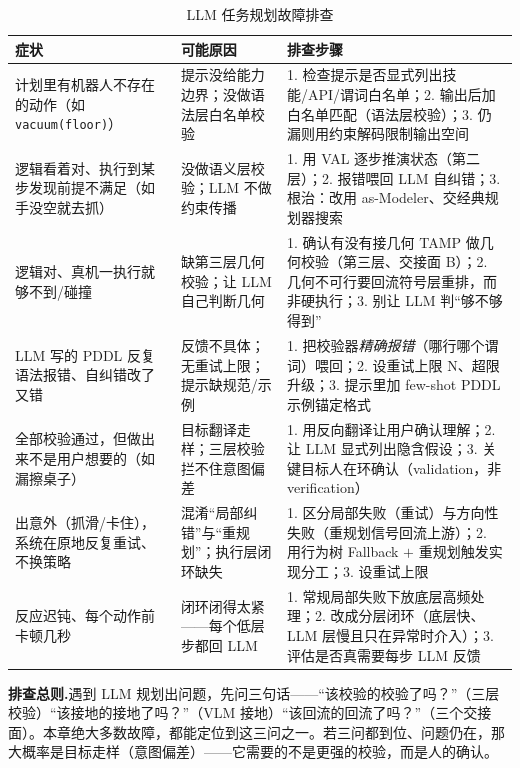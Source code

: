 \begin{table}[H]\centering\small
\caption{LLM 任务规划故障排查}
\label{tab:llm-troubleshoot}
\begin{tabular}{p{3.4cm}p{3.4cm}p{5.2cm}}
\toprule
症状 & 可能原因 & 排查步骤 \\
\midrule
计划里有机器人不存在的动作（如 \texttt{vacuum(floor)}） & 提示没给能力边界；没做语法层白名单校验 & 1. 检查提示是否显式列出技能/API/谓词白名单；2. 输出后加白名单匹配（语法层校验）；3. 仍漏则用约束解码限制输出空间 \\
逻辑看着对、执行到某步发现前提不满足（如手没空就去抓） & 没做语义层校验；LLM 不做约束传播 & 1. 用 VAL 逐步推演状态（第二层）；2. 报错喂回 LLM 自纠错；3. 根治：改用 as-Modeler、交经典规划器搜索 \\
逻辑对、真机一执行就够不到/碰撞 & 缺第三层几何校验；让 LLM 自己判断几何 & 1. 确认有没有接几何 TAMP 做几何校验（第三层、交接面 B）；2. 几何不可行要回流符号层重排，而非硬执行；3. 别让 LLM 判“够不够得到” \\
LLM 写的 PDDL 反复语法报错、自纠错改了又错 & 反馈不具体；无重试上限；提示缺规范/示例 & 1. 把校验器\emph{精确报错}（哪行哪个谓词）喂回；2. 设重试上限 N、超限升级；3. 提示里加 few-shot PDDL 示例锚定格式 \\
全部校验通过，但做出来不是用户想要的（如漏擦桌子） & 目标翻译走样；三层校验拦不住意图偏差 & 1. 用反向翻译让用户确认理解；2. 让 LLM 显式列出隐含假设；3. 关键目标人在环确认（validation，非 verification） \\
出意外（抓滑/卡住），系统在原地反复重试、不换策略 & 混淆“局部纠错”与“重规划”；执行层闭环缺失 & 1. 区分局部失败（重试）与方向性失败（重规划信号回流上游）；2. 用行为树 Fallback $+$ 重规划触发实现分工；3. 设重试上限 \\
反应迟钝、每个动作前卡顿几秒 & 闭环闭得太紧——每个低层步都回 LLM & 1. 常规局部失败下放底层高频处理；2. 改成分层闭环（底层快、LLM 层慢且只在异常时介入）；3. 评估是否真需要每步 LLM 反馈 \\
\bottomrule
\end{tabular}
\end{table}

\begin{note}
\textbf{排查总则.}\;遇到 LLM 规划出问题，先问三句话——“该校验的校验了吗？”（三层校验）“该接地的接地了吗？”（VLM 接地）“该回流的回流了吗？”（三个交接面）。本章绝大多数故障，都能定位到这三问之一。若三问都到位、问题仍在，那大概率是目标走样（意图偏差）——它需要的不是更强的校验，而是人的确认。
\end{note}


